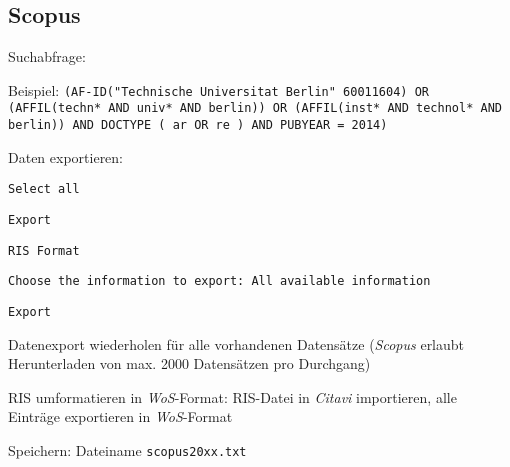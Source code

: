 \subsection*{Scopus}
\begin{compactitem}
\item Suchabfrage: 
	\begin{compactitem}
	\item Beispiel: \texttt{(AF-ID("Technische Universitat Berlin" 60011604) OR \newline(AFFIL(techn* AND univ* AND berlin)) OR (AFFIL(inst* AND technol* AND berlin)) AND  DOCTYPE ( ar  OR  re )  AND  PUBYEAR  =  2014)}
	\end{compactitem}
\item Daten exportieren: 
	\begin{compactitem}
	\item \texttt{Select all}
    \item \texttt{Export}
    \item \texttt{RIS Format}
    \item \texttt{Choose the information to export: All available information}
    \item \texttt{Export}
	\end{compactitem}
\item Datenexport wiederholen für alle vorhandenen Datensätze (\textit{Scopus} erlaubt Herunterladen von max. 2000 Datensätzen pro Durchgang)
\item RIS umformatieren in \textit{WoS}-Format: RIS-Datei in \textit{Citavi} importieren, alle Einträge exportieren in \textit{WoS}-Format
\item Speichern: Dateiname \texttt{scopus20xx.txt}
\end{compactitem}

